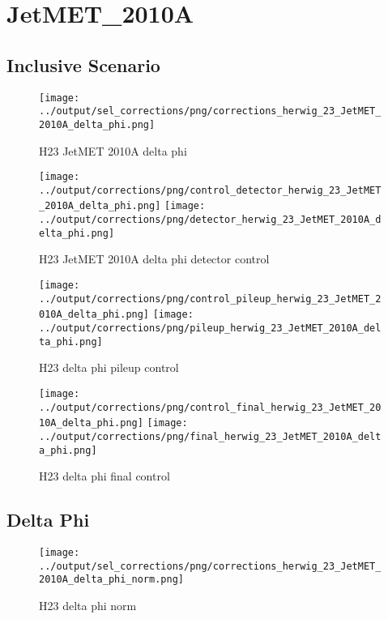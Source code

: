 \documentclass[11pt]{book}
\begin{document}
\section{JetMET\_2010A}

\subsection{Inclusive Scenario}
\begin{figure}[ht]
\centering
\texttt{[image: ../output/sel\_corrections/png/corrections\_herwig\_23\_JetMET\_2010A\_delta\_phi.png]}
\caption{H23 JetMET 2010A delta phi}
\label{fig:H23_JetMET_2010A_delta_phi}
\end{figure}

\begin{figure}[ht]
\centering
\texttt{[image: ../output/corrections/png/control\_detector\_herwig\_23\_JetMET\_2010A\_delta\_phi.png]}
\texttt{[image: ../output/corrections/png/detector\_herwig\_23\_JetMET\_2010A\_delta\_phi.png]}
\caption{H23 JetMET 2010A delta phi detector control}
\label{fig:H23_JetMET_2010A_delta_phi_detector_control}
\end{figure}

\begin{figure}[ht]
\centering
\texttt{[image: ../output/corrections/png/control\_pileup\_herwig\_23\_JetMET\_2010A\_delta\_phi.png]}
\texttt{[image: ../output/corrections/png/pileup\_herwig\_23\_JetMET\_2010A\_delta\_phi.png]}
\caption{H23 delta phi pileup control}
\label{fig:H23_JetMET_2010A_delta_phi_pileup_control}
\end{figure}


\begin{figure}[ht]
\centering
\texttt{[image: ../output/corrections/png/control\_final\_herwig\_23\_JetMET\_2010A\_delta\_phi.png]}
\texttt{[image: ../output/corrections/png/final\_herwig\_23\_JetMET\_2010A\_delta\_phi.png]}
\caption{H23 delta phi final control}
\label{fig:H23_JetMET_2010A_delta_phi_final_control}
\end{figure}

\subsection{Delta Phi}
\begin{figure}[ht]
\centering
\texttt{[image: ../output/sel\_corrections/png/corrections\_herwig\_23\_JetMET\_2010A\_delta\_phi\_norm.png]}
\caption{H23 delta phi norm}
\label{fig:H23_JetMET_2010A_delta_phi_norm}
\end{figure}
\end{document}
